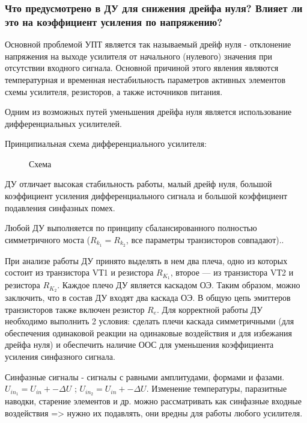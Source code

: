 \subsubsection{Что предусмотрено в ДУ для снижения дрейфа нуля? Влияет ли это на коэффициент усиления по напряжению?}

Основной проблемой УПТ является так называемый дрейф нуля - отклонение напряжения на выходе усилителя от начального (нулевого) значения при отсутствии входного сигнала. Основной причиной этого явления являются температурная и временная нестабильность параметров активных элементов схемы усилителя, резисторов, а также источников питания.

Одним из возможных путей уменьшения дрейфа нуля является использование дифференциальных усилителей.

Принципиальная схема дифференциального усилителя:
\begin{center}
	\begin{figure}[h!]
		\caption{Схема}
	\end{figure}
\end{center} 

ДУ отличает высокая стабильность работы, малый дрейф нуля, большой коэффициент усиления дифференциального сигнала и большой коэффициент подавления синфазных помех.

Любой ДУ выполняется по принципу сбалансированного полностью симметричного моста ($R_{k_1} = R_{k_2}$, все параметры транзисторов совпадают).. 

При анализе работы ДУ принято выделять в нем два плеча, одно из которых состоит из транзистора VТ1 и резистора $R_{K_1}$, второе  — из транзистора VТ2 и резистора $R_{K_2}$. Каждое плечо ДУ является каскадом ОЭ. Таким образом, можно заключить, что в состав ДУ входят два каскада ОЭ. В общую цепь эмиттеров транзисторов также включен резистор $R_e$. Для корректной работы ДУ необходимо выполнить 2 условия: сделать плечи каскада симметричными (для обеспечения одинаковой реакции на одинаковые воздействия и для избежания дрейфа нуля) и обеспечить наличие ООС для уменьшения коэффициента усиления синфазного сигнала.

Синфазные сигналы  - сигналы с равными амплитудами, формами и фазами. $U_{in_1} = U_{in} +- \Delta U$ ; $U_{in_2} = U_{in} +- \Delta U$. Изменение температуры, паразитные наводки, старение элементов и др. можно рассматривать как синфазные входные воздействия => нужно их подавлять, они вредны для работы любого усилителя.

